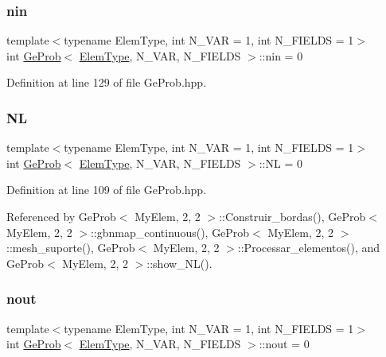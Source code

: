 \mbox{\label{classGeProb_a2434630926ff59b81f12420354f533a7}} 
\subsubsection{\texorpdfstring{nin}{nin}}
{\footnotesize\ttfamily template$<$typename Elem\+Type, int N\+\_\+\+V\+AR = 1, int N\+\_\+\+F\+I\+E\+L\+DS = 1$>$ \\
int \hyperlink{classGeProb}{Ge\+Prob}$<$ \hyperlink{spectral_8h_aaa2c1a7b2d1b12c590d730fe6ac839fa}{Elem\+Type}, N\+\_\+\+V\+AR, N\+\_\+\+F\+I\+E\+L\+DS $>$\+::nin = 0\hspace{0.3cm}{\ttfamily [protected]}}



Definition at line 129 of file Ge\+Prob.\+hpp.

\mbox{\label{classGeProb_a4608e6b80b16c86a7bd7451adebc6f69}} 
\subsubsection{\texorpdfstring{NL}{NL}}
{\footnotesize\ttfamily template$<$typename Elem\+Type, int N\+\_\+\+V\+AR = 1, int N\+\_\+\+F\+I\+E\+L\+DS = 1$>$ \\
int \hyperlink{classGeProb}{Ge\+Prob}$<$ \hyperlink{spectral_8h_aaa2c1a7b2d1b12c590d730fe6ac839fa}{Elem\+Type}, N\+\_\+\+V\+AR, N\+\_\+\+F\+I\+E\+L\+DS $>$\+::NL = 0\hspace{0.3cm}{\ttfamily [protected]}}



Definition at line 109 of file Ge\+Prob.\+hpp.



Referenced by Ge\+Prob$<$ My\+Elem, 2, 2 $>$\+::\+Construir\+\_\+bordas(), Ge\+Prob$<$ My\+Elem, 2, 2 $>$\+::gbnmap\+\_\+continuous(), Ge\+Prob$<$ My\+Elem, 2, 2 $>$\+::mesh\+\_\+suporte(), Ge\+Prob$<$ My\+Elem, 2, 2 $>$\+::\+Processar\+\_\+elementos(), and Ge\+Prob$<$ My\+Elem, 2, 2 $>$\+::show\+\_\+\+N\+L().

\mbox{\label{classGeProb_ae6ee447645542bcb3addd78e9896f546}} 
\subsubsection{\texorpdfstring{nout}{nout}}
{\footnotesize\ttfamily template$<$typename Elem\+Type, int N\+\_\+\+V\+AR = 1, int N\+\_\+\+F\+I\+E\+L\+DS = 1$>$ \\
int \hyperlink{classGeProb}{Ge\+Prob}$<$ \hyperlink{spectral_8h_aaa2c1a7b2d1b12c590d730fe6ac839fa}{Elem\+Type}, N\+\_\+\+V\+AR, N\+\_\+\+F\+I\+E\+L\+DS $>$\+::nout = 0\hspace{0.3cm}{\ttfamily [protected]}}



